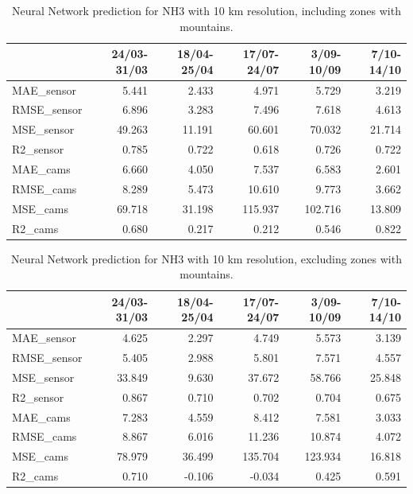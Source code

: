 \begin{table}[H]
\begin{tabular}{lrrrrr}
\toprule
 &  24/03-31/03 &  18/04-25/04 &  17/07-24/07 &  3/09-10/09 &  7/10-14/10 \\
\midrule
 MAE\_sensor &        5.441 &        2.433 &        4.971 &       5.729 &       3.219 \\
RMSE\_sensor &        6.896 &        3.283 &        7.496 &       7.618 &       4.613 \\
 MSE\_sensor &       49.263 &       11.191 &       60.601 &      70.032 &      21.714 \\
  R2\_sensor &        0.785 &        0.722 &        0.618 &       0.726 &       0.722 \\
   MAE\_cams &        6.660 &        4.050 &        7.537 &       6.583 &       2.601 \\
  RMSE\_cams &        8.289 &        5.473 &       10.610 &       9.773 &       3.662 \\
   MSE\_cams &       69.718 &       31.198 &      115.937 &     102.716 &      13.809 \\
    R2\_cams &        0.680 &        0.217 &        0.212 &       0.546 &       0.822 \\
\bottomrule
\end{tabular}
\caption{Neural Network prediction for NH3 with 10 km resolution, including zones with mountains.}
\end{table}
\begin{table}[H]
\begin{tabular}{lrrrrr}
\toprule
 &  24/03-31/03 &  18/04-25/04 &  17/07-24/07 &  3/09-10/09 &  7/10-14/10 \\
\midrule
 MAE\_sensor &        4.625 &        2.297 &        4.749 &       5.573 &       3.139 \\
RMSE\_sensor &        5.405 &        2.988 &        5.801 &       7.571 &       4.557 \\
 MSE\_sensor &       33.849 &        9.630 &       37.672 &      58.766 &      25.848 \\
  R2\_sensor &        0.867 &        0.710 &        0.702 &       0.704 &       0.675 \\
   MAE\_cams &        7.283 &        4.559 &        8.412 &       7.581 &       3.033 \\
  RMSE\_cams &        8.867 &        6.016 &       11.236 &      10.874 &       4.072 \\
   MSE\_cams &       78.979 &       36.499 &      135.704 &     123.934 &      16.818 \\
    R2\_cams &        0.710 &       -0.106 &       -0.034 &       0.425 &       0.591 \\
\bottomrule
\end{tabular}
\caption{Neural Network prediction for NH3 with 10 km resolution, excluding zones with mountains.}
\end{table}
